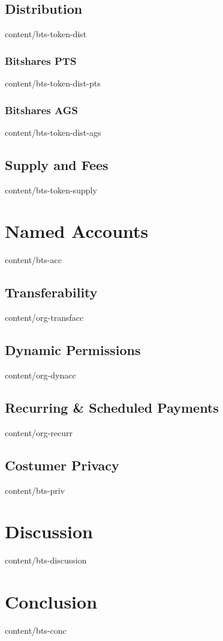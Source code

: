 \documentclass[conference,final,10pt,a4paper]{IEEEtran}
\begin{document}
\subsection    { Distribution                    }  { content/bts-token-dist     } 
\subsubsection { Bitshares PTS                   }  { content/bts-token-dist-pts } 
\subsubsection { Bitshares AGS                   }  { content/bts-token-dist-ags } 
\subsection    { Supply and Fees                 }  { content/bts-token-supply   } 

\section       { Named Accounts                  }  { content/bts-acc            } 
\subsection    { Transferability                 }  { content/org-transfacc      } 
\subsection    { Dynamic Permissions             }  { content/org-dynacc         } 
\subsection    { Recurring \& Scheduled Payments }  { content/org-recurr         } 
\subsection    { Costumer Privacy                }  { content/bts-priv           } 

\section       { Discussion                      }  { content/bts-discussion     } 

\section       { Conclusion                      }  { content/bts-conc           } 


\end{document}

